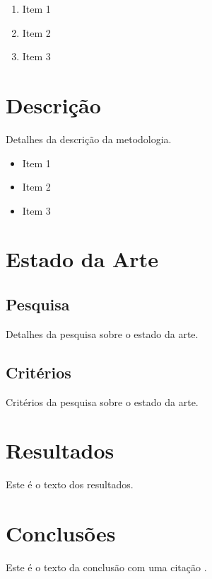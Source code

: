 \documentclass[12pt,a4paper,final]{article}
\begin{document}
\begin{enumerate}
    \item Item 1
    \item Item 2
    \item Item 3
\end{enumerate}

\section{Descrição}
Detalhes da descrição da metodologia.

\begin{itemize}
    \item Item 1
    \item Item 2
    \item Item 3
\end{itemize}

\section{Estado da Arte}
\subsection{Pesquisa}
Detalhes da pesquisa sobre o estado da arte.

\subsection{Critérios}
Critérios da pesquisa sobre o estado da arte.

\section{Resultados}
Este é o texto dos resultados.

\begin{table}[]
\centering
{}
\caption{Tabela Exemplo}
\label{tab:my-table}
\end{table}

\section{Conclusões}
Este é o texto da conclusão com uma citação \cite{su15010857}.

\newpage
\printbibliography
\end{document}
